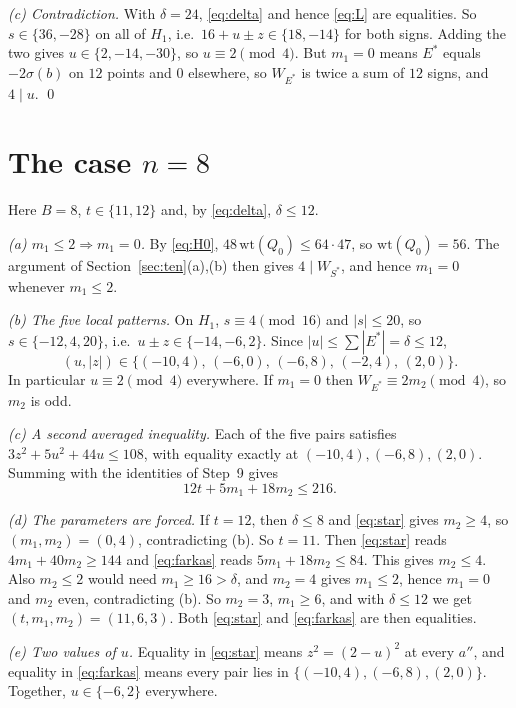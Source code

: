 \documentclass[11pt]{amsart}
\theoremstyle{remark}
\newcommand{\W}{W}
\newcommand{\sg}{\sigma}
\newcommand{\wt}{\mathrm{wt}}
\begin{document}
\emph{(c) Contradiction.} With $\delta=24$, \eqref{eq:delta} and hence \eqref{eq:L} are
equalities. So $s\in\{36,-28\}$ on all of $H_1$, i.e.\ $16+u\pm z\in\{18,-14\}$ for both signs.
Adding the two gives $u\in\{2,-14,-30\}$, so $u\equiv2\pmod4$. But $m_1=0$ means $E^*$ equals
$-2\sg(b)$ on $12$ points and $0$ elsewhere, so $\W_{E^*}$ is twice a sum of $12$ signs, and
$4\mid u$. \qed

\section{The case $n=8$}\label{sec:eight}

Here $B=8$, $t\in\{11,12\}$ and, by \eqref{eq:delta}, $\delta\le12$.

\emph{(a) $m_1\le2\Rightarrow m_1=0$.} By \eqref{eq:H0}, $48\,\wt(Q_0)\le 64\cdot47$, so
$\wt(Q_0)=56$. The argument of Section~\ref{sec:ten}(a),(b) then gives $4\mid\W_{S^*}$, and
hence $m_1=0$ whenever $m_1\le2$.

\emph{(b) The five local patterns.} On $H_1$, $s\equiv4\pmod{16}$ and $|s|\le20$, so
$s\in\{-12,4,20\}$, i.e.\ $u\pm z\in\{-14,-6,2\}$. Since $|u|\le\sum|E^*|=\delta\le12$,
\[
  (u,|z|)\in\{(-10,4),\,(-6,0),\,(-6,8),\,(-2,4),\,(2,0)\}.
\]
In particular $u\equiv2\pmod 4$ everywhere. If $m_1=0$ then
$\W_{E^*}\equiv 2m_2\pmod4$, so $m_2$ is odd.

\emph{(c) A second averaged inequality.} Each of the five pairs satisfies
$3z^2+5u^2+44u\le108$, with equality exactly at $(-10,4),(-6,8),(2,0)$. Summing with the
identities of Step~9 gives
\begin{equation}\label{eq:farkas}
  12t+5m_1+18m_2\le 216 .
\end{equation}

\emph{(d) The parameters are forced.} If $t=12$, then $\delta\le8$ and \eqref{eq:star} gives
$m_2\ge4$, so $(m_1,m_2)=(0,4)$, contradicting (b). So $t=11$. Then \eqref{eq:star} reads
$4m_1+40m_2\ge144$ and \eqref{eq:farkas} reads $5m_1+18m_2\le84$. This gives $m_2\le4$. Also
$m_2\le2$ would need $m_1\ge16>\delta$, and $m_2=4$ gives $m_1\le2$, hence $m_1=0$ and $m_2$
even, contradicting (b). So $m_2=3$, $m_1\ge6$, and with $\delta\le12$ we get
$(t,m_1,m_2)=(11,6,3)$. Both \eqref{eq:star} and \eqref{eq:farkas} are then equalities.

\emph{(e) Two values of $u$.} Equality in \eqref{eq:star} means $z^2=(2-u)^2$ at every $a''$,
and equality in \eqref{eq:farkas} means every pair lies in $\{(-10,4),(-6,8),(2,0)\}$.
Together, $u\in\{-6,2\}$ everywhere.
\end{document}
